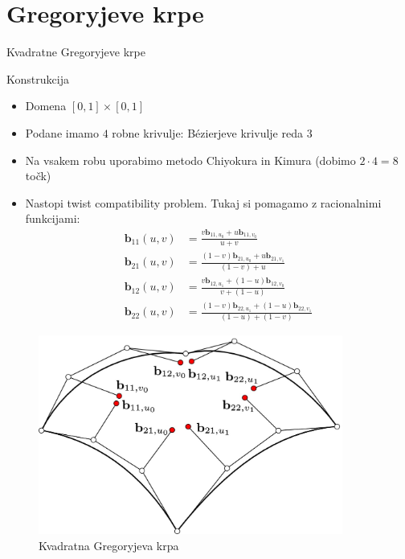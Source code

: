 \documentclass[a4paper,8pt]{beamer}
\newcommand{\tbf}{\textbf}
\begin{document}
\section{Gregoryjeve krpe}
\begin{frame}{Kvadratne Gregoryjeve krpe}


Konstrukcija
\begin{itemize}
	\item Domena $[0,1] \times [0,1]$
	\item Podane imamo $4$ robne krivulje: Bézierjeve krivulje reda $3$
	\item Na vsakem robu uporabimo metodo Chiyokura in Kimura (dobimo $2 \cdot 4 = 8$ točk)
	\item Nastopi twist compatibility problem. Tukaj si pomagamo z racionalnimi funkcijami:
		\begin{align*}
		\tbf{b}_{11} (u, v) &=  \frac{v \textbf{b}_{11,u_0}+u\tbf{b}_{11,v_0}}{u +v} \\
		\tbf{b}_{21} (u, v) &= \frac{(1-v) \tbf{b}_{21,u_0}+u\tbf{b}_{21,v_1}}{(1-v)+u} \\
		\tbf{b}_{12} (u, v) &= \frac{v \tbf{b}_{12,u_1}+(1-u)\tbf{b}_{12,v_0}}{v+(1-u)} \\
		\tbf{b}_{22} (u, v) &= \frac{(1-v) \tbf{b}_{22,u_1}+(1-u)\tbf{b}_{22,v_1}}{(1-u)+(1-v)} 
		\end{align*}
\end{itemize}
	
\end{frame}
\begin{frame}
	\begin{figure}[h]
		\centering
		\includegraphics[width=10cm]{gregory_krpe_kvadratna.jpg}
		\caption{Kvadratna Gregoryjeva krpa}
	\end{figure}
\end{frame}
\end{document}
